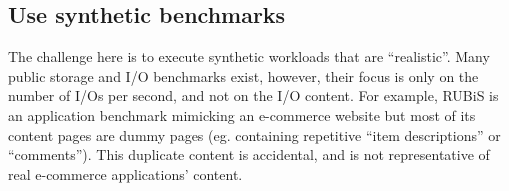 \subsection{Use synthetic benchmarks}
The challenge here is to execute synthetic workloads that are ``realistic''.
Many public storage and I/O benchmarks exist, however, their
focus is only on the number of I/Os per second, and not on the I/O content.
For example, RUBiS is an application benchmark mimicking
an e-commerce website but most of its content pages are dummy pages (eg.
containing repetitive ``item descriptions'' or ``comments''). 
This duplicate content is accidental, and is not
representative of real e-commerce applications' content.

